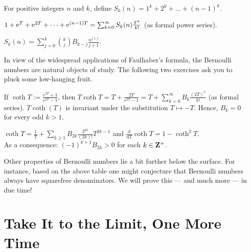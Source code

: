 For positive integers $n$ and $k$, define $S_k(n) = 1^k + 2^k + \dots + (n-1)^k$.

\begin{prob}\label{prob:41} $1 + \mathrm{e}^T + \mathrm{e}^{2T} +\dots+ \mathrm{e}^{(n-1) T} = \sum_{k=0}^{\infty} S_k(n) \frac{T^k}{k!}$ (as formal power series).
\end{prob}




\begin{prob}\label{prob:42} $\displaystyle S_k(n) = \sum_{j=0}^{k} \binom{k}{j} B_{k-j} \frac{n^{j+1}}{j+1}$.
\end{prob}



In view of the widespread applications of Faulhaber's formula, the Bernoulli numbers are natural objects of study. The following two exercises ask you to pluck some
low-hanging fruit.

\begin{prob}\label{prob:43}If $\coth{T} := \frac{e^{2T}+1}{e^{2T}-1}$, then $T \coth{T} = T + \frac{2T}{e^{2T}-1} = T+ \sum_{k=0}^{\infty}B_k \frac{(2T)^k}{k!}$ (as formal series). $T\coth(T)$ is invariant under the substitution $T\mapsto -T$. Hence, $B_{k}=0$ for every odd $k > 1$.
\end{prob}


\begin{prob}\label{prob:alternatingsigns} $\coth{T} = \frac{1}{T} + \sum_{k\ge 1} B_{2k} \frac{2^{2k}}{(2k)!} T^{2k-1}$ and $\frac{\mathrm{d}}{\mathrm{d}T}\coth{T} = 1-\coth^2{T}$.\\ As a consequence: $(-1)^{k+1} B_{2k} > 0$ for each $k \in \mathbf{Z}^{+}$.
\end{prob}

Other properties of Bernoulli numbers lie a bit further below the surface. For instance, based on the above table one might conjecture that Bernoulli numbers always have squarefree denominators. We will prove this ---  and much more --- in due time!
\label{setbern}

\section*{Take It to the Limit, One More Time}


